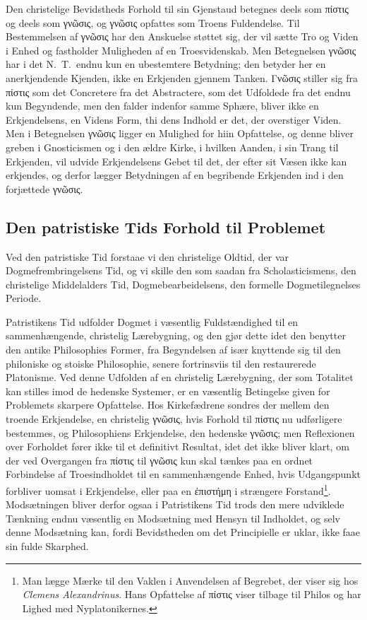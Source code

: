 \documentclass[12pt,a4paper]{book}
\newcommand{\opage}[1]{\marginnote{\footnotesize\textit{[#1]}}}
\begin{document}
Den christelige Bevidstheds Forhold til sin Gjenstaud betegnes deels som
πίστις og deels som γνῶσις, og γνῶσις opfattes som Troens Fuldendelse. Til
Bestemmelsen af γνῶσις har den Anskuelse støttet sig, der vil sætte Tro og
Viden i Enhed og fastholder Muligheden af en Troesvidenskab. Men Betegnelsen
γνῶσις har i det N.\ T.\ endnu kun en ubestemtere Betydning; den betyder her en
anerkjendende Kjenden, ikke en Erkjenden gjennem Tanken. Γνῶσις stiller sig fra
πίστις som det Concretere fra det Abstractere, som det Udfoldede fra det endnu
kun Begyndende, men den falder indenfor samme Sphære, bliver ikke en
Erkjendelsens, en Videns Form, thi dens Indhold er det, der overstiger Viden.
Men i Betegnelsen γνῶσις ligger en Mulighed for hiin Opfattelse, og denne
bliver greben i Gnosticismen og i den ældre Kirke, i hvilken Aanden, i sin
Trang til Erkjenden, vil udvide Erkjendelsens Gebet til det, der efter sit
Væsen ikke kan erkjendes, og derfor lægger Betydningen af en begribende
Erkjenden ind i den forjættede γνῶσις.

\subsection{Den patristiske Tids Forhold til Problemet}
\label{ssec:patristisk}

\noindent Ved den patristiske Tid forstaae vi den christelige Oldtid, der var
Dogmefrembringelsens Tid, og vi skille den som saadan fra Scholasticismens, den
christelige \opage{17}Middelalders Tid, Dogmebearbeidelsens, den formelle Dogmetilegnelses
Periode.

Patristikens Tid udfolder Dogmet i væsentlig Fuldstændighed til en
sammenhængende, christelig Lærebygning, og den gjør dette idet den benytter den
antike Philosophies Former, fra Begyndelsen af især knyttende sig til den philoniske og stoiske Philosophie, senere fortrinsviis til den restaurerede
Platonisme. Ved denne Udfolden af en christelig Lærebygning, der som Totalitet
kan stilles imod de hedenske Systemer, er en væsentlig Betingelse given for
Problemets skarpere Opfattelse. Hos Kirkefædrene sondres der mellem den troende
Erkjendelse, en christelig γνῶσις, hvis Forhold til πίστις nu udførligere
bestemmes, og Philosophiens Erkjendelse, den hedenske γνῶσις; men Reflexionen
over Forholdet fører ikke til et definitivt Resultat, idet det ikke bliver klart, om
der ved Overgangen fra πίστις til γνῶσις kun skal tænkes paa en ordnet
Forbindelse af Troesindholdet til en sammenhængende Enhed, hvis Udgangspunkt
forbliver uomsat i Erkjendelse, eller paa en ἐπιστήμη i strængere Forstand\footnote{Man lægge Mærke til den Vaklen i Anvendelsen af Begrebet, der
viser sig hos \emph{Clemens Alexandrinus}. Hans Opfattelse af πίστις viser tilbage til
Philos og har Lighed med Nyplatonikernes.}. Modsætningen bliver derfor ogsaa i
Patristikens Tid trods den mere udviklede Tænkning endnu væsentlig en Modsætning
med Hensyn til Indholdet, og selv denne Modsætning kan, fordi Bevidstheden om det
Principielle er uklar, ikke faae sin fulde Skarphed.
\end{document}
